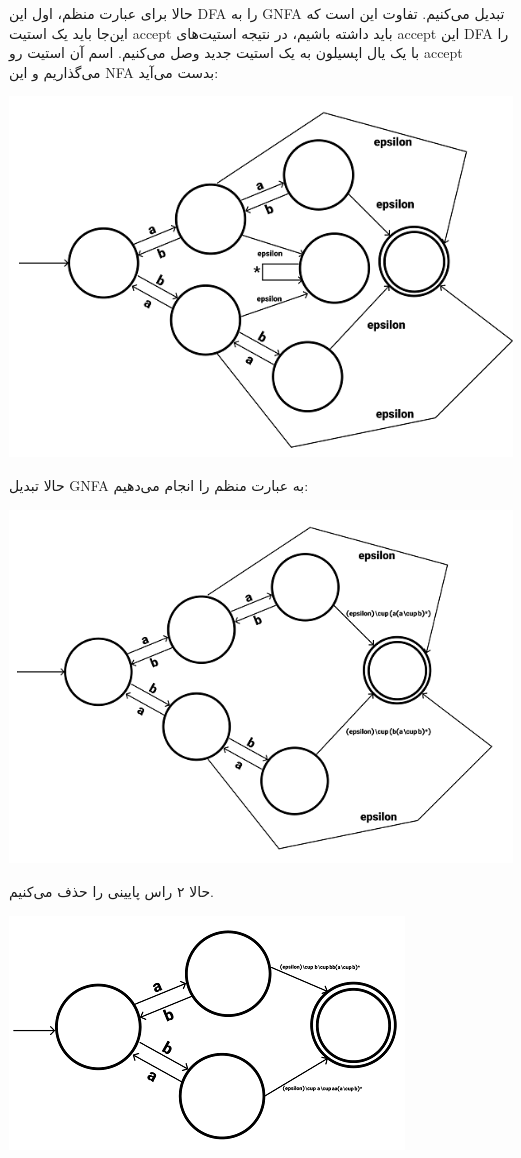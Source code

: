 حالا برای عبارت منظم، اول این DFA را به GNFA تبدیل می‌کنیم. تفاوت این است که این‌جا باید یک استیت accept باید داشته باشیم، در نتیجه استیت‌های accept این DFA را با یک یال اپسیلون به یک استیت جدید وصل می‌کنیم. اسم آن استیت رو accept می‌گذاریم و این NFA بدست می‌آید:

\begin{center}
	\includegraphics{DFA20}
\end{center}

حالا تبدیل GNFA به عبارت منظم را انجام می‌دهیم:

\begin{center}
	\includegraphics{DFA19}
\end{center}

حالا ۲ راس پایینی را حذف می‌کنیم.

\begin{center}
	\includegraphics{DFA21}
\end{center}

